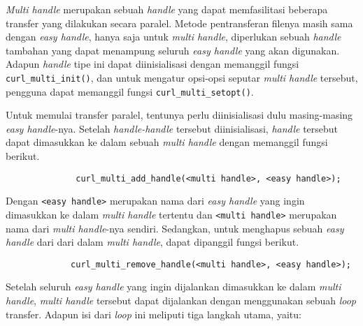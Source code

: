 \textit{Multi handle} merupakan sebuah \textit{handle} yang dapat memfasilitasi beberapa transfer yang dilakukan secara paralel. Metode pentransferan filenya masih sama dengan \textit{easy handle}, hanya saja untuk \textit{multi handle}, diperlukan sebuah \textit{handle} tambahan yang dapat menampung seluruh \textit{easy handle} yang akan digunakan. Adapun \textit{handle} tipe ini dapat diinisialisasi dengan memanggil fungsi \verb|curl_multi_init()|, dan untuk mengatur opsi-opsi seputar \textit{multi handle} tersebut, pengguna dapat memanggil fungsi \verb|curl_multi_setopt()|.

Untuk memulai transfer paralel, tentunya perlu diinisialisasi dulu masing-masing \textit{easy handle}-nya. Setelah \textit{handle-handle} tersebut diinisialisasi, \textit{handle} tersebut dapat dimasukkan ke dalam sebuah \textit{multi handle} dengan memanggil fungsi berikut.

\begin{verbatim}
              curl_multi_add_handle(<multi handle>, <easy handle>);
\end{verbatim}
\noindent
Dengan \verb|<easy handle>| merupakan nama dari \textit{easy handle} yang ingin dimasukkan ke dalam \textit{multi handle} tertentu dan \verb|<multi handle>| merupakan nama dari \textit{multi handle}-nya sendiri. Sedangkan, untuk menghapus sebuah \textit{easy handle} dari dari dalam \textit{multi handle}, dapat dipanggil fungsi berikut.

\begin{verbatim}
             curl_multi_remove_handle(<multi handle>, <easy handle>);
\end{verbatim}

Setelah seluruh \textit{easy handle} yang ingin dijalankan dimasukkan ke dalam \textit{multi handle}, \textit{multi handle} tersebut dapat dijalankan dengan menggunakan sebuah \textit{loop} transfer. Adapun isi dari \textit{loop} ini meliputi tiga langkah utama, yaitu:

